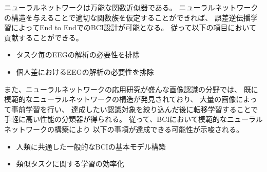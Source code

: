 ニューラルネットワークは万能な関数近似器である。
ニューラルネットワークの構造を与えることで適切な関数族を仮定することができれば、
誤差逆伝播学習によってEnd to EndでのBCI設計が可能となる。
従って以下の項目において貢献することができる。
\begin{itemize}
    \item タスク毎のEEGの解析の必要性を排除
    \item 個人差におけるEEGの解析の必要性を排除
\end{itemize}

また、ニューラルネットワークの応用研究が盛んな画像認識の分野では、
既に模範的なニューラルネットワークの構造が発見されており、
大量の画像によって事前学習を行い、
達成したい認識対象を絞り込んだ後に転移学習することで
手軽に高い性能の分類器が得られる。
従って、BCIにおいて模範的なニューラルネットワークの構築により
以下の事項が達成できる可能性が示唆される。
\begin{itemize}
    \item 人類に共通した一般的なBCIの基本モデル構築
    \item 類似タスクに関する学習の効率化
\end{itemize}



